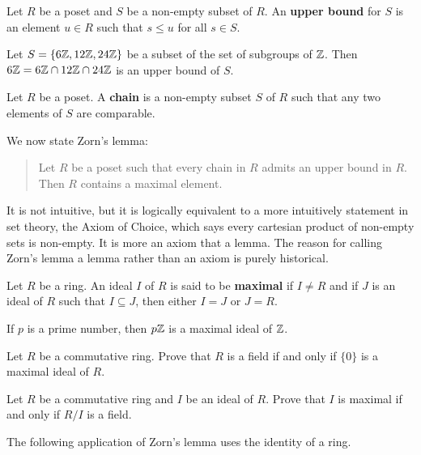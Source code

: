 \begin{definition}
    Let $R$ be a poset and $S$ be a non-empty subset of $R$. An \textbf{upper bound}
    for $S$ is an element $u\in R$ such that $s\leq u$ for all $s\in S$. 
\end{definition}

\begin{example}
    Let $S=\{6\mathbb{Z},12\mathbb{Z},24\mathbb{Z}\}$ be a subset of the set of subgroups of $\mathbb{Z}$. Then 
    $6\mathbb{Z}=6\mathbb{Z}\cap 12\mathbb{Z}\cap 24\mathbb{Z}$ is an upper bound of $S$. 
\end{example}

\begin{definition}
    Let $R$ be a poset. A \textbf{chain} is a non-empty subset $S$ of $R$ such that
    any two elements of $S$ are comparable. 
\end{definition}

We now state Zorn's lemma:

\begin{quote}
Let $R$ be a poset such that 
every chain in $R$ admits an upper bound in $R$. 
Then $R$ contains a maximal element. 
\end{quote}

It is not intuitive, but it is logically equivalent to a more 
intuitively statement in set theory, the Axiom of Choice, 
which says every cartesian product of non-empty sets is non-empty. 
It is more an axiom that a lemma. 
The reason for calling Zorn’s lemma a lemma rather 
than an axiom is purely historical.

\begin{definition}
	Let $R$ be a ring. An ideal $I$ of $R$ is said to be \textbf{maximal}
	if $I\ne R$ and if $J$ is an ideal of $R$ such that $I\subseteq J$, then 
	either $I=J$ or $J=R$. 
\end{definition}

If $p$ is a prime number, then $p\mathbb{Z}$ is a maximal ideal of $\mathbb{Z}$.

\begin{exercise}
Let $R$ be a commutative ring. Prove that $R$ is a 
field if and only if $\{0\}$ is a maximal ideal of $R$. 	
\end{exercise}

\begin{exercise}
Let $R$ be a commutative ring and $I$ be an ideal of $R$. Prove that $I$ is maximal
if and only if $R/I$ is a field.  	
\end{exercise}

The following application of Zorn's lemma uses 
the identity of a ring. 

